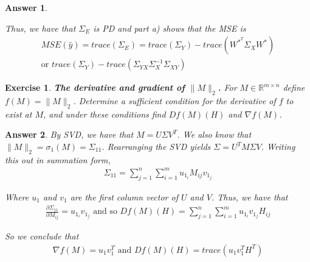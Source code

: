 \documentclass[12pt]{article}
\theoremstyle{colon}
\newtheorem{exercise}{Exercise}
\newtheorem*{answer}{Answer}
\begin{document}
\begin{answer}
\begin{enumerate}[label=\alph*)]
      Thus, we have that $\Sigma_E$ is PD and part a) shows that the MSE is
      \begin{gather*}
        MSE(\hat{y}) = trace(\Sigma_E) = trace(\Sigma_Y)- trace(W^{*^T} \Sigma_X W^*) \\
        \text{or } trace(\Sigma_Y)- trace(\Sigma_{YX} \Sigma_X^{-1} \Sigma_{XY})
      \end{gather*}

  \end{enumerate}
\end{answer}

\clearpage

\begin{exercise}
  \textbf{The derivative and gradient of $\lVert M \rVert_2$.} For $M \in \mathbb{R}^{m \times n}$ define $f(M) = \lVert M \rVert_2$. Determine a sufficient condition for the derivative of $f$ to exist at $M$, and under these conditions find $D f(M)(H)$ and $\nabla f(M)$.
\end{exercise}

\begin{answer}
  By SVD, we have that $M = U\Sigma V^T$. We also know that $\lVert M \rVert_2 = \sigma_1(M) = \Sigma_{11}$. Rearranging the SVD yields $\Sigma = U^T M \Sigma V$. Writing this out in summation form,
  \begin{gather*}
    \Sigma_{11} = \sum_{j=1}^n \sum_{i=1}^m u_{1_i} M_{ij} v_{1_j}
  \end{gather*}

  Where $u_1$ and $v_1$ are the first column vector of $U$ and $V$. Thus, we have that
  \begin{gather*}
    \frac{\partial \Sigma_{11}}{\partial M_{ij}} = u_{1_i} v_{1_j} \text{ and so } D f(M)(H) = \sum_{j=1}^n \sum_{i=1}^m u_{1_i} v_{1_j} H_{ij}
  \end{gather*}

  So we conclude that
  \begin{gather*}
    \nabla f(M) = u_1 v_1^T \text{ and } D f(M)(H) = trace(u_1 v_1^T H^T)
  \end{gather*}

\end{answer}
\end{document}
